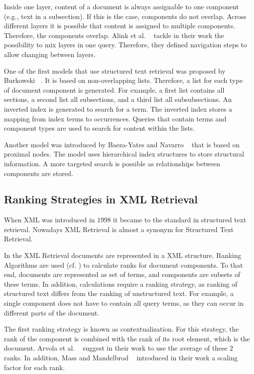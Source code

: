 Inside one layer, content of a document is always assignable to one component (e.g., text in a subsection). If this is the case, components do not overlap. Across different layers it is possible that content is assigned to multiple components. Therefore, the components overlap. Alink et al. ~\cite{AlinkBBV06} tackle in their work the possibility to mix layers in one query. Therefore, they defined navigation steps to allow changing between layers. 

One of the first models that use structured text retrieval was proposed by Burkowski ~\cite{BURKOWSKI1992333, Burkowski92}. It is based on non-overlapping lists. Therefore, a list for each type of document component is generated. For example, a first list contains all sections, a second list all subsections, and a third list all subsubsections. An inverted index is generated to search for a term. The inverted index stores a mapping from index terms to occurrences. Queries that contain terms and component types are used to search for content within the lists.

Another model was introduced by Baeza-Yates and Navarro ~\cite{GB95, GB97} that is based on proximal nodes. The model uses hierarchical index structures to store structural information. A more targeted search is possible as relationships between components are stored.

\subsection{Ranking Strategies in XML Retrieval}
\label{sec:ranking_strategies_in_xml_retrieval}

When XML was introduced in $1998$ it became to the standard in structured text retrieval. Nowadays XML Retrieval is almost a synonym for Structured Text Retrieval. 

In the XML Retrieval documents are represented in a XML structure. Ranking Algorithms are used (cf. ) to calculate ranks for document components. To that end, documents are represented as set of terms, and components are subsets of these terms. In addition, calculations require a ranking strategy, as ranking of structured text differs from the ranking of unstructured text. For example, a single component does not have to contain all query terms, as they can occur in different parts of the document.

The first ranking strategy is known as contextualization. For this strategy, the rank of the component is combined with the rank of its root element, which is the document. Arvola et al. ~\cite{ArvolaJK05} suggest in their work to use the average of these $2$ ranks. In addition, Mass and Mandelbrod ~\cite{MassM04} introduced in their work a scaling factor for each rank.

